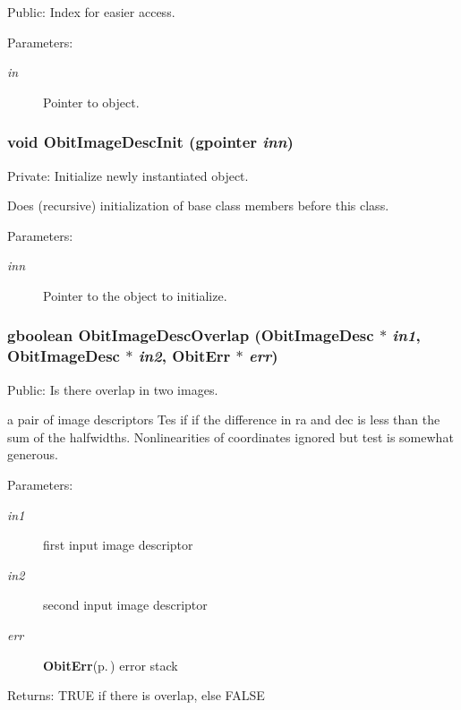 Public: Index for easier access. 

\begin{Desc}
\item[Parameters:]
\begin{description}
\item[{\em in}]Pointer to object. \end{description}
\end{Desc}
\subsubsection{\setlength{\rightskip}{0pt plus 5cm}void Obit\-Image\-Desc\-Init (gpointer {\em inn})}\label{ObitImageDesc_8c_a3}


Private: Initialize newly instantiated object. 

Does (recursive) initialization of base class members before this class. \begin{Desc}
\item[Parameters:]
\begin{description}
\item[{\em inn}]Pointer to the object to initialize. \end{description}
\end{Desc}
\subsubsection{\setlength{\rightskip}{0pt plus 5cm}gboolean Obit\-Image\-Desc\-Overlap ({\bf Obit\-Image\-Desc} $\ast$ {\em in1}, {\bf Obit\-Image\-Desc} $\ast$ {\em in2}, {\bf Obit\-Err} $\ast$ {\em err})}\label{ObitImageDesc_8c_a16}


Public: Is there overlap in two images. 

a pair of image descriptors Tes if if the difference in ra and dec is less than the sum of the halfwidths. Nonlinearities of coordinates ignored but test is somewhat generous. \begin{Desc}
\item[Parameters:]
\begin{description}
\item[{\em in1}]first input image descriptor \item[{\em in2}]second input image descriptor \item[{\em err}]{\bf Obit\-Err}{\rm (p.\,\pageref{structObitErr})} error stack \end{description}
\end{Desc}
\begin{Desc}
\item[Returns:]TRUE if there is overlap, else FALSE \end{Desc}
